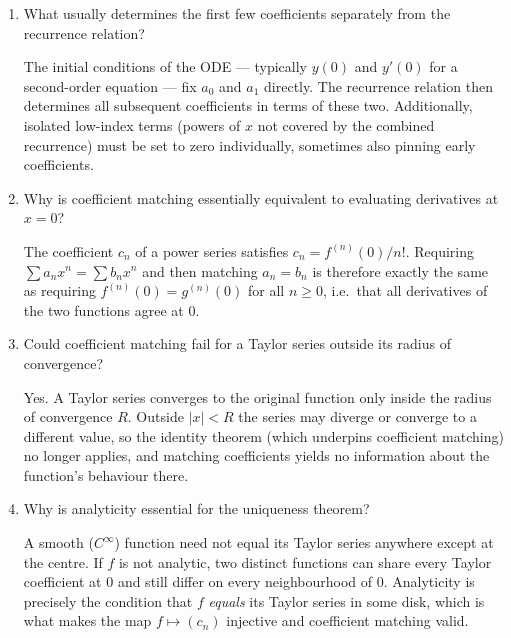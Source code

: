 \documentclass{self-check}
\begin{document}
\begin{enumerate}[leftmargin=*, itemsep=8pt]
    \begin{answer}
      After substituting the ansatz \(y = \sum a_{n} x^{n}\), reindexing all series so they run in the same power \(x^{n}\), and combining into a single sum equal to zero, equating the coefficient of \(x^{n}\) to zero yields the recurrence relation, which expresses \(a_{n+k}\) (for some fixed \(k\)) in terms of earlier coefficients.
    \end{answer}
  \item What usually determines the first few coefficients separately from the recurrence relation?
    \begin{answer}
      The initial conditions of the ODE --- typically \(y(0)\) and \(y'(0)\) for a second-order equation --- fix \(a_{0}\) and \(a_{1}\) directly. The recurrence relation then determines all subsequent coefficients in terms of these two. Additionally, isolated low-index terms (powers of \(x\) not covered by the combined recurrence) must be set to zero individually, sometimes also pinning early coefficients.
    \end{answer}
  \item Why is coefficient matching essentially equivalent to evaluating derivatives at \(x=0\)?
    \begin{answer}
      The coefficient \(c_{n}\) of a power series satisfies \(c_{n} = f^{(n)}(0)/n!\). Requiring \(\sum a_{n} x^{n} = \sum b_{n} x^{n}\) and then matching \(a_{n} = b_{n}\) is therefore exactly the same as requiring \(f^{(n)}(0) = g^{(n)}(0)\) for all \(n \ge 0\), i.e.\ that all derivatives of the two functions agree at \(0\).
    \end{answer}
  \item Could coefficient matching fail for a Taylor series outside its radius of convergence?
    \begin{answer}
      Yes. A Taylor series converges to the original function only inside the radius of convergence \(R\). Outside \(|x| < R\) the series may diverge or converge to a different value, so the identity theorem (which underpins coefficient matching) no longer applies, and matching coefficients yields no information about the function's behaviour there.
    \end{answer}
  \item Why is analyticity essential for the uniqueness theorem?
    \begin{answer}
      A smooth (\(C^{\infty}\)) function need not equal its Taylor series anywhere except at the centre. If \(f\) is not analytic, two distinct functions can share every Taylor coefficient at \(0\) and still differ on every neighbourhood of \(0\). Analyticity is precisely the condition that \(f\) \emph{equals} its Taylor series in some disk, which is what makes the map \(f \mapsto (c_{n})\) injective and coefficient matching valid.

\end{answer}
\end{enumerate}
\end{document}
